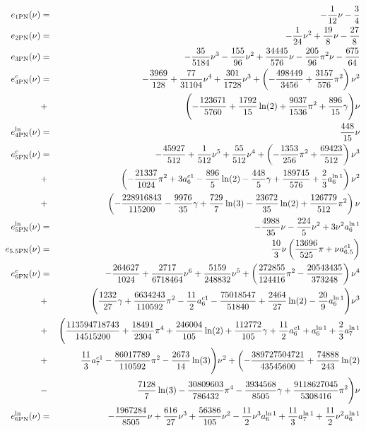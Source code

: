 \begin{eqnarray}
\label{eB6PN}
e_{\rm 1PN} (\nu)&=&  -\frac{1}{12}\nu-\frac34 \nonumber\\
e_{\rm 2PN} (\nu)&=&  -\frac{1}{24}\nu^2+\frac{19}8 \nu-\frac{27}{8}\nonumber\\
e_{\rm 3PN} (\nu)&=& -\frac{35}{5184}\nu^3 -\frac{155}{96}\nu^2+\frac{34445}{576}\nu-\frac{205}{96}\pi^2\nu-\frac{675}{64}  \nonumber\\
e_{\rm 4PN}^c (\nu)&=& -\frac{3969}{128}+\frac{77}{31104}\nu^4+\frac{301}{1728}\nu^3
+\left(-\frac{498449}{3456} +\frac{3157}{576}\pi^2\right)\nu^2\nonumber\\
&+&\Biggl(-\frac{123671}{5760}+\frac{1792}{15} \ln(2)+\frac{9037}{1536} \pi^2
+\frac{896}{15} \gamma\Biggl)\nu \nonumber\\
e_{\rm 4PN}^{\ln}(\nu)&=& \frac{448}{15}\nu  \nonumber\\
e_{\rm 5PN}^c (\nu)&=& -\frac{45927}{512}+\frac{1}{512}\nu^5+\frac{55}{512}\nu^4
+\left(-\frac{1353}{256}\pi^2+\frac{69423}{512} \right)\nu^3\nonumber\\
&+&\left(-\frac{21337}{1024}\pi^2+3 a_6^{c1}
-\frac{896}{5}\ln(2)-\frac{448}{5}\gamma+\frac{189745}{576}+\frac{2}{3}a_{6}^{\ln 1}\right)\nu^2\nonumber\\
&+&\left(-\frac{228916843}{115200}-\frac{9976}{35}\gamma+\frac{729}{7}\ln(3) 
 -\frac{23672}{35}\ln(2)+\frac{126779}{512}\pi^2 \right)\nu \nonumber\\
e_{\rm 5PN}^{\ln}(\nu)&=& -\frac{4988}{35}\nu-\frac{224}{5}\nu^2+3\nu^2 a_6^{\ln 1}\nonumber\\
e_{\rm 5.5PN}(\nu)&=&\frac{10}{3}\nu \left(\frac{13696}{525}\pi+\nu  a_{6.5}^{c1}\right)\nonumber\\
e_{\rm 6PN}^c (\nu)&=& -\frac{264627}{1024}+\frac{2717}{6718464}\nu^6+\frac{5159}{248832}\nu^5
+\left(\frac{272855}{124416}\pi^2-\frac{20543435}{373248} \right)\nu^4\nonumber\\
&+&\Biggl(\frac{1232}{27}\gamma+\frac{6634243}{110592}\pi^2-\frac{11}{2} a_6^{c1}
-\frac{75018547}{51840}+\frac{2464}{27}\ln(2) -\frac{20}{9}a_6^{\ln 1} \Biggl)\nu^3\nonumber\\
&+& \Biggl(\frac{113594718743}{14515200}+\frac{18491}{2304}\pi^4
+\frac{246004}{105}\ln(2)+\frac{112772}{105}\gamma+\frac{11}{2} a_6^{c1}+a_6^{\ln 1}+\frac{2}{3}a_7^{\ln 1}\nonumber\\
&+& \frac{11}{3} a_7^{c1}-\frac{86017789}{110592}\pi^2-\frac{2673}{14}\ln(3)\Biggl)\nu^2
+\biggl(- \frac{389727504721}{43545600}
 +\frac{74888}{243}\ln(2)\nonumber\\
&-& \frac{7128}{7}\ln(3)-\frac{30809603}{786432}\pi^4
-\frac{3934568}{8505}\gamma +\frac{9118627045}{5308416}\pi^2\Biggl)\nu
\nonumber\\ 
e_{\rm 6PN}^{\ln}(\nu)&=& -\frac{1967284}{8505}\nu+\frac{616}{27}\nu^3+\frac{56386}{105}\nu^2 -\frac{11}{2}\nu^3 a_6^{\ln 1}+\frac{11}{3}a_7^{\ln 1}+\frac{11}{2}\nu^2 a_6^{\ln 1}\nonumber\\
\end{eqnarray}